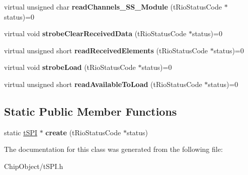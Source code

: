 \begin{DoxyCompactItemize}
\item 
\hypertarget{classnFPGA_1_1nFRC__2012__1__6__4_1_1tSPI_aade7252b6768857bfa1790d7a1220722}{
virtual unsigned char {\bfseries readChannels\_\-SS\_\-Module} (tRioStatusCode $\ast$status)=0}
\label{classnFPGA_1_1nFRC__2012__1__6__4_1_1tSPI_aade7252b6768857bfa1790d7a1220722}

\item 
\hypertarget{classnFPGA_1_1nFRC__2012__1__6__4_1_1tSPI_a5540828ae24138ed0d86cfd00c115fc0}{
virtual void {\bfseries strobeClearReceivedData} (tRioStatusCode $\ast$status)=0}
\label{classnFPGA_1_1nFRC__2012__1__6__4_1_1tSPI_a5540828ae24138ed0d86cfd00c115fc0}

\item 
\hypertarget{classnFPGA_1_1nFRC__2012__1__6__4_1_1tSPI_a29d85b5ca0bca94e7161838ea92a7f5a}{
virtual unsigned short {\bfseries readReceivedElements} (tRioStatusCode $\ast$status)=0}
\label{classnFPGA_1_1nFRC__2012__1__6__4_1_1tSPI_a29d85b5ca0bca94e7161838ea92a7f5a}

\item 
\hypertarget{classnFPGA_1_1nFRC__2012__1__6__4_1_1tSPI_a6cb5b61b48f57bb9e85f20c0902d92ff}{
virtual void {\bfseries strobeLoad} (tRioStatusCode $\ast$status)=0}
\label{classnFPGA_1_1nFRC__2012__1__6__4_1_1tSPI_a6cb5b61b48f57bb9e85f20c0902d92ff}

\item 
\hypertarget{classnFPGA_1_1nFRC__2012__1__6__4_1_1tSPI_aa19bdf308fa945499db4063cf67d0a72}{
virtual unsigned short {\bfseries readAvailableToLoad} (tRioStatusCode $\ast$status)=0}
\label{classnFPGA_1_1nFRC__2012__1__6__4_1_1tSPI_aa19bdf308fa945499db4063cf67d0a72}

\end{DoxyCompactItemize}
\subsection*{Static Public Member Functions}
\begin{DoxyCompactItemize}
\item 
\hypertarget{classnFPGA_1_1nFRC__2012__1__6__4_1_1tSPI_a5119000c5da9ed05b53c9e76f62f4c61}{
static \hyperlink{classnFPGA_1_1nFRC__2012__1__6__4_1_1tSPI}{tSPI} $\ast$ {\bfseries create} (tRioStatusCode $\ast$status)}
\label{classnFPGA_1_1nFRC__2012__1__6__4_1_1tSPI_a5119000c5da9ed05b53c9e76f62f4c61}

\end{DoxyCompactItemize}


The documentation for this class was generated from the following file:\begin{DoxyCompactItemize}
\item 
ChipObject/tSPI.h\end{DoxyCompactItemize}
